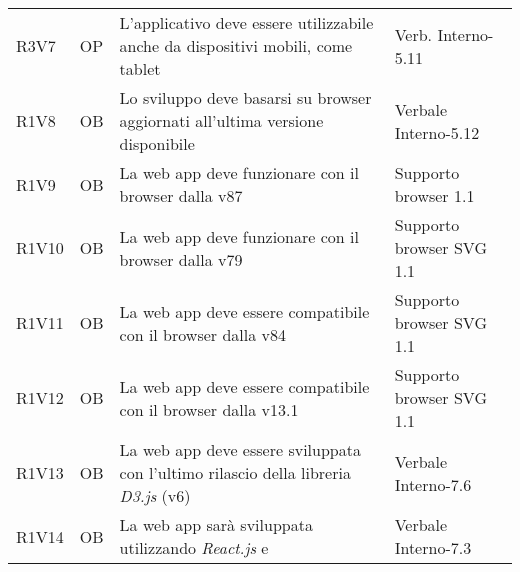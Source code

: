 {\begin{longtable}{C{2cm} | C{1.5cm} | C{9cm} | C{3.3cm}}
R3V7 & OP & L'applicativo deve essere utilizzabile anche da dispositivi mobili, come tablet & Verb. Interno-5.11\\
R1V8 & OB & Lo sviluppo deve basarsi su browser aggiornati all'ultima versione disponibile & Verbale Interno-5.12\\
R1V9 & OB & La web app deve funzionare con il browser  dalla v87 & Supporto browser  1.1 \\
R1V10 & OB & La web app deve funzionare con il browser  dalla v79 & Supporto browser SVG 1.1 \\
R1V11 & OB & La web app deve essere compatibile con il browser  dalla v84 & Supporto browser SVG 1.1\\
R1V12 & OB & La web app deve essere compatibile con il browser  dalla v13.1 & Supporto browser SVG 1.1\\
R1V13 & OB & La web app deve essere sviluppata con l'ultimo rilascio della libreria \textit{D3.js} (v6) & Verbale Interno-7.6\\
R1V14 & OB & La web app sarà sviluppata utilizzando \textit{React.js} e \textit{} & Verbale Interno-7.3\\

\end{longtable}
}